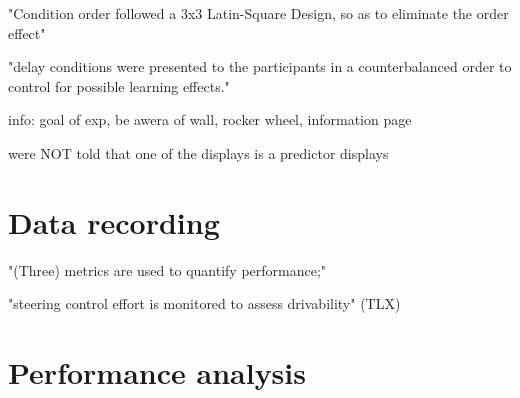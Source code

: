 \citep{Lu2018} "Condition order followed a 3x3 Latin-Square Design, so as to eliminate the order effect"

"delay conditions were presented to the participants in a counterbalanced order to control for possible learning effects."

info: goal of exp, be awera of wall, rocker wheel, information page

were NOT told that one of the displays is a predictor displays


\section{Data recording}

"(Three) metrics are used to quantify performance;"

"steering control effort is monitored to assess drivability" (TLX)


\section{Performance analysis}
